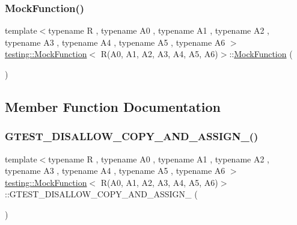 \subsubsection{\texorpdfstring{MockFunction()}{MockFunction()}}
{\footnotesize\ttfamily template$<$typename R , typename A0 , typename A1 , typename A2 , typename A3 , typename A4 , typename A5 , typename A6 $>$ \\
\mbox{\hyperlink{classtesting_1_1_mock_function}{testing\+::\+Mock\+Function}}$<$ R(A0, A1, A2, A3, A4, A5, A6)$>$\+::\mbox{\hyperlink{classtesting_1_1_mock_function}{Mock\+Function}} (\begin{DoxyParamCaption}{ }\end{DoxyParamCaption})\hspace{0.3cm}{\ttfamily [inline]}}



\subsection{Member Function Documentation}
\mbox{\label{classtesting_1_1_mock_function_3_01_r_07_a0_00_01_a1_00_01_a2_00_01_a3_00_01_a4_00_01_a5_00_01_a6_08_4_a31b17e7a2efc41a249baafa04d76884a}} 
\subsubsection{\texorpdfstring{GTEST\_DISALLOW\_COPY\_AND\_ASSIGN\_()}{GTEST\_DISALLOW\_COPY\_AND\_ASSIGN\_()}}
{\footnotesize\ttfamily template$<$typename R , typename A0 , typename A1 , typename A2 , typename A3 , typename A4 , typename A5 , typename A6 $>$ \\
\mbox{\hyperlink{classtesting_1_1_mock_function}{testing\+::\+Mock\+Function}}$<$ R(A0, A1, A2, A3, A4, A5, A6)$>$\+::G\+T\+E\+S\+T\+\_\+\+D\+I\+S\+A\+L\+L\+O\+W\+\_\+\+C\+O\+P\+Y\+\_\+\+A\+N\+D\+\_\+\+A\+S\+S\+I\+G\+N\+\_\+ (\begin{DoxyParamCaption}\item[{\mbox{\hyperlink{classtesting_1_1_mock_function}{Mock\+Function}}$<$ R(A0, A1, A2, A3, A4, A5, A6)$>$}]{ }\end{DoxyParamCaption})\hspace{0.3cm}{\ttfamily [private]}}

